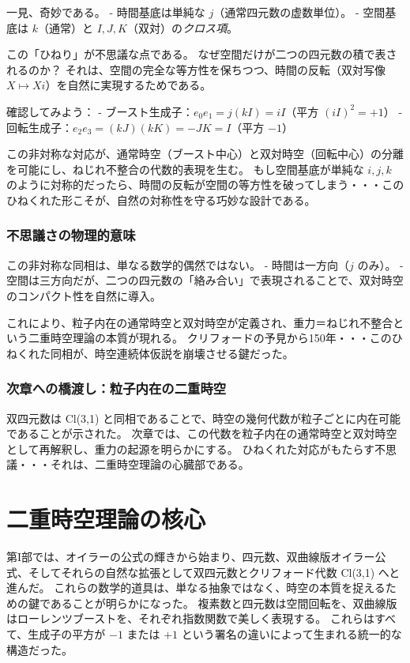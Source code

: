 \documentclass[dvipdfmx,a4paper]{jsbook}
\theoremstyle{definition}
\theoremstyle{remark}
\begin{document}
一見、奇妙である。
- 時間基底は単純な $j$（通常四元数の虚数単位）。
- 空間基底は $k$（通常）と $I,J,K$（双対）の\emph{クロス項}。

この「ひねり」が不思議な点である。
なぜ空間だけが二つの四元数の積で表されるのか？
それは、空間の完全な等方性を保ちつつ、時間の反転（双対写像 $X \mapsto Xi$）を自然に実現するためである。

確認してみよう：
- ブースト生成子：$e_0 e_1 = j (kI) = iI$（平方 $(iI)^2 = +1$）
- 回転生成子：$e_2 e_3 = (kJ)(kK) = -J K = I$（平方 $-1$）

この非対称な対応が、通常時空（ブースト中心）と双対時空（回転中心）の分離を可能にし、ねじれ不整合の代数的表現を生む。
もし空間基底が単純な $i,j,k$ のように対称的だったら、時間の反転が空間の等方性を破ってしまう・・・このひねくれた形こそが、自然の対称性を守る巧妙な設計である。

\section{不思議さの物理的意味}
\label{sec:twist-meaning}

この非対称な同相は、単なる数学的偶然ではない。
- 時間は一方向（$j$ のみ）。
- 空間は三方向だが、二つの四元数の「絡み合い」で表現されることで、双対時空のコンパクト性を自然に導入。

これにより、粒子内在の通常時空と双対時空が定義され、重力＝ねじれ不整合という二重時空理論の本質が現れる。
クリフォードの予見から150年・・・このひねくれた同相が、時空連続体仮説を崩壊させる鍵だった。

\section{次章への橋渡し：粒子内在の二重時空}
\label{sec:to-particle-dual}

双四元数は Cl(3,1) と同相であることで、時空の幾何代数が粒子ごとに内在可能であることが示された。
次章では、この代数を粒子内在の通常時空と双対時空として再解釈し、重力の起源を明らかにする。
ひねくれた対応がもたらす不思議・・・それは、二重時空理論の心臓部である。

\part{二重時空理論の核心}

第I部では、オイラーの公式の輝きから始まり、四元数、双曲線版オイラー公式、そしてそれらの自然な拡張として双四元数とクリフォード代数 Cl(3,1) へと進んだ。
これらの数学的道具は、単なる抽象ではなく、時空の本質を捉えるための鍵であることが明らかになった。
複素数と四元数は空間回転を、双曲線版はローレンツブーストを、それぞれ指数関数で美しく表現する。
これらはすべて、生成子の平方が $-1$ または $+1$ という署名の違いによって生まれる統一的な構造だった。
\end{document}
